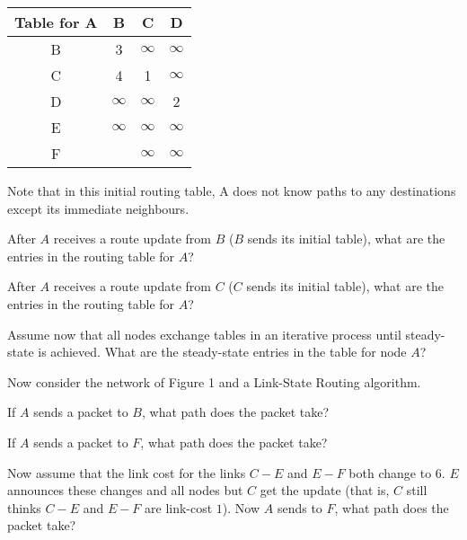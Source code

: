 \documentclass{supervision}
\begin{document}
\begin{questions}
\begin{parts}
            \begin{table}[h]
              \centering
              \begin{tabular}{|c|ccc|}
                \hline
                Table for A & B        & C        & D        \\ \hline
                B           & 3        & $\infty$ & $\infty$ \\
                C           & 4        & 1        & $\infty$ \\
                D           & $\infty$ & $\infty$ & 2        \\
                E           & $\infty$ & $\infty$ & $\infty$ \\
                F           &          & $\infty$ & $\infty$ \\ \hline
              \end{tabular}
            \end{table}

            Note that in this initial routing table, A does not know paths
            to any destinations except its immediate neighbours.

            \begin{subparts}
              \subpart After $A$ receives a route update from $B$ ($B$ sends
                its initial table), what are the entries in the routing table
                for $A$?

              \subpart After $A$ receives a route update from $C$ ($C$ sends
                its initial table), what are the entries in the routing table
                for $A$?

              \subpart Assume now that all nodes exchange tables in an
                iterative process until steady-state is achieved. What are the
                steady-state entries in the table for node $A$?
            \end{subparts}

            Now consider the network of Figure 1 and a Link-State Routing
            algorithm.

            \begin{subparts}
              \subpart If $A$ sends a packet to $B$, what path does the packet
                take?

              \subpart If $A$ sends a packet to $F$, what path does the packet
                take?

              \subpart Now assume that the link cost for the links $C-E$ and
                $E-F$ both change to $6$. $E$ announces these changes and all
                nodes but $C$ get the update (that is, $C$ still thinks $C-E$
                and $E-F$ are link-cost $1$). Now $A$ sends to $F$, what path
                does the packet take?


\end{subparts}
\end{parts}
\end{questions}
\end{document}
